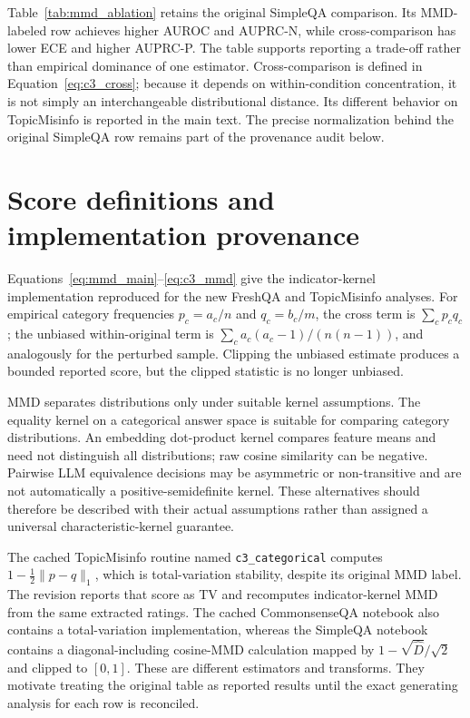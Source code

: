 \documentclass[11pt]{article}
\theoremstyle{plain}
\theoremstyle{definition}
\theoremstyle{remark}
\newif\ifrevisionmarkup
\DeclareRobustCommand{\revisioncolor}{\ifrevisionmarkup\color{red}\fi}
\newenvironment{revision}{\par\begingroup\revisioncolor}{\par\endgroup}
\begin{document}
\begin{revision}
Table~\ref{tab:mmd_ablation} retains the original SimpleQA comparison. Its MMD-labeled row achieves higher AUROC and AUPRC-N, while cross-comparison has lower ECE and higher AUPRC-P. The table supports reporting a trade-off rather than empirical dominance of one estimator. Cross-comparison is defined in Equation~\ref{eq:c3_cross}; because it depends on within-condition concentration, it is not simply an interchangeable distributional distance. Its different behavior on TopicMisinfo is reported in the main text. The precise normalization behind the original SimpleQA row remains part of the provenance audit below.
\end{revision}

\begin{revision}
\section{Score definitions and implementation provenance}
\label{app:Operationalization through MMD}
Equations~\ref{eq:mmd_main}--\ref{eq:c3_mmd} give the indicator-kernel implementation reproduced for the new FreshQA and TopicMisinfo analyses. For empirical category frequencies $p_c=a_c/n$ and $q_c=b_c/m$, the cross term is $\sum_c p_cq_c$; the unbiased within-original term is $\sum_c a_c(a_c-1)/(n(n-1))$, and analogously for the perturbed sample. Clipping the unbiased estimate produces a bounded reported score, but the clipped statistic is no longer unbiased.

MMD separates distributions only under suitable kernel assumptions. The equality kernel on a categorical answer space is suitable for comparing category distributions. An embedding dot-product kernel compares feature means and need not distinguish all distributions; raw cosine similarity can be negative. Pairwise LLM equivalence decisions may be asymmetric or non-transitive and are not automatically a positive-semidefinite kernel. These alternatives should therefore be described with their actual assumptions rather than assigned a universal characteristic-kernel guarantee.

The cached TopicMisinfo routine named \texttt{c3\_categorical} computes $1-\frac12\lVert p-q\rVert_1$, which is total-variation stability, despite its original MMD label. The revision reports that score as TV and recomputes indicator-kernel MMD from the same extracted ratings. The cached CommonsenseQA notebook also contains a total-variation implementation, whereas the SimpleQA notebook contains a diagonal-including cosine-MMD calculation mapped by $1-\sqrt{\widehat D}/\sqrt 2$ and clipped to $[0,1]$. These are different estimators and transforms. They motivate treating the original table as reported results until the exact generating analysis for each row is reconciled.


\end{revision}
\end{document}
